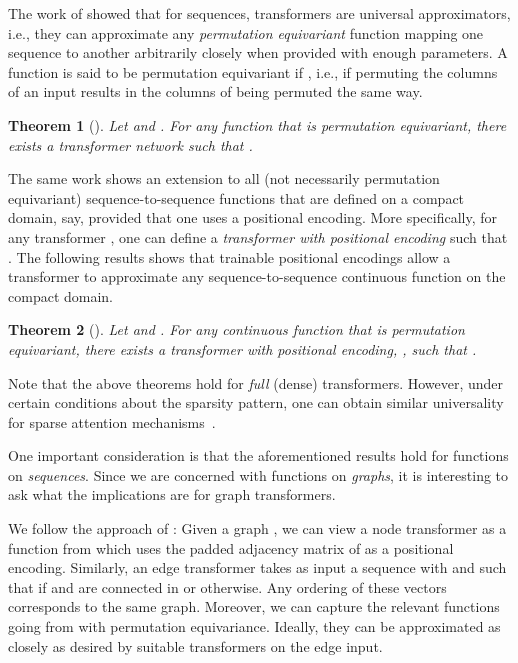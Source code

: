 \documentclass{article}
\theoremstyle{plain}
\newtheorem{theorem}{Theorem}[section]
\theoremstyle{definition}
\theoremstyle{remark}
\begin{document}
The work of \citet{YunBRRK20} showed that for sequences, transformers are universal approximators, i.e., they can approximate any \emph{permutation equivariant} function mapping one sequence to another arbitrarily closely when provided with enough parameters. A function  is said to be permutation equivariant if , i.e., if permuting the columns of an input  results in the columns of  being permuted the same way.
\begin{theorem}[\citealp{YunBRRK20}]\label{thm:univapprox-perm}
 Let  and . For any function  that is permutation equivariant, there exists a transformer network  such that .
\end{theorem}
The same work shows an extension to all (not necessarily permutation equivariant) sequence-to-sequence functions that are defined on a compact domain, say,  provided that one uses a positional encoding. More specifically, for any transformer , one can define a \emph{transformer with positional encoding}  such that . The following results shows that trainable positional encodings allow a transformer to approximate any sequence-to-sequence continuous function on the compact domain.
\begin{theorem}[\citealp{YunBRRK20}]\label{thm:univapprox-trans}
 Let  and . For any continuous function  that is permutation equivariant, there exists a transformer with positional encoding, , such that .
\end{theorem}


Note that the above theorems hold for \emph{full} (dense) transformers. However, under certain conditions about the sparsity pattern, one can obtain similar universality for sparse attention mechanisms~\citep{YunCBRRK20}.

One important consideration is that the aforementioned results hold for functions on \emph{sequences}. Since we are concerned with functions on \emph{graphs}, it is interesting to ask what the implications are for graph transformers.

We follow the approach of \citet{kreuzer2021rethinking}: Given a graph , we can view a node transformer as a function from  which uses the padded adjacency matrix of  as a positional encoding. Similarly, an edge transformer takes as input a sequence  with  and  such that  if  and  are connected in  or  otherwise. Any ordering of these vectors corresponds to the same graph. Moreover, we can capture the relevant functions going from  with permutation equivariance. Ideally, they can be approximated as closely as desired by suitable transformers on the edge input.
\end{document}

